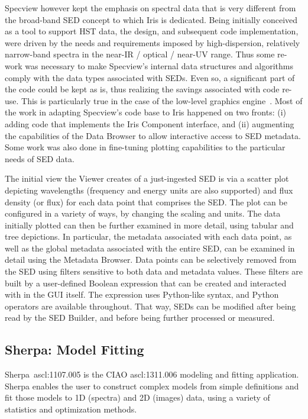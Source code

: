 \documentclass[final,5p,authoryear]{elsarticle}
\begin{document}
Specview however kept the emphasis on spectral data that is very different from
the broad-band SED concept to which Iris is dedicated. Being initially conceived
as a tool to support HST data, the design, and subsequent code implementation,
were driven by the needs and requirements imposed by high-dispersion, relatively
narrow-band spectra in the near-IR / optical / near-UV range. Thus some re-work
was necessary to make Specview's internal data structures and algorithms comply with
the data types associated with SEDs. Even so, a significant part of the code
could be kept as is, thus realizing the savings associated with code re-use.
This is particularly true in the case of the low-level graphics
engine~\citep{2000ASPC..216...79B}. Most of the work in adapting Specview's code
base to Iris happened on two fronts: (i) adding code that implements the Iris
Component interface, and (ii) augmenting the capabilities of the Data Browser to
allow interactive access to SED metadata. Some work was also done in fine-tuning
plotting capabilities to the particular needs of SED data.

The initial view the Viewer creates of a just-ingested SED is via a scatter plot
depicting wavelengths (frequency and energy units are also supported) and flux
density (or flux) for each data point that comprises the SED. The plot can be
configured in a variety of ways, by changing the scaling and units. The data
initially plotted can then be further examined in more detail, using tabular and
tree depictions. In particular, the metadata associated with each data point, as
well as the global metadata associated with the entire SED, can be examined in
detail using the Metadata Browser. Data points can be selectively removed from
the SED using filters sensitive to both data and metadata values. These filters
are built by a user-defined Boolean expression that can be created and
interacted with in the GUI itself. The expression uses Python-like syntax, and
Python operators are available throughout. That way, SEDs can be modified after
being read by the SED Builder, and before being further processed or measured.

\subsection{Sherpa: Model Fitting} \label{subsec:sherpa} Sherpa~ascl:1107.005 is the
CIAO ascl:1311.006 \citep{2006SPIE.6270E..60F}
modeling and fitting application. Sherpa enables the user to construct complex
models from simple definitions and fit those models to 1D (spectra) and 2D
(images) data, using a variety of statistics and optimization methods.
\end{document}
